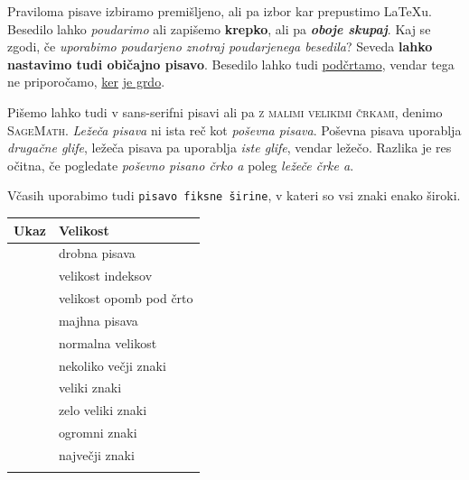\documentclass[12pt]{article}
\begin{document}
\vspace{2cm}

Praviloma pisave izbiramo premišljeno, ali pa izbor kar prepustimo LaTeXu.
Besedilo lahko \emph{poudarimo} ali zapišemo \textbf{krepko}, ali pa \emph{\textbf{oboje skupaj}}.
Kaj se zgodi, če \emph{uporabimo poudarjeno \emph{znotraj} poudarjenega besedila}?
Seveda \textbf{lahko nastavimo tudi \textnormal{običajno} pisavo}.
Besedilo lahko tudi \underline{podčrtamo}, vendar tega ne priporočamo, \underline{ker} \underline{je grdo}.

Pišemo lahko tudi v \textsf{sans-serifni pisavi} ali pa \textsc{z malimi velikimi črkami},
denimo \textsc{SageMath}. 
\textsl{Ležeča pisava} {ni ista reč kot} \textit{poševna pisava}.
Poševna pisava uporablja \textit{drugačne glife}, ležeča pisava pa uporablja \textsl{iste glife}, vendar ležečo. 
Razlika je res očitna, če pogledate \textit{poševno pisano črko a} poleg \textsl{ležeče črke a}.

Včasih uporabimo tudi \texttt{pisavo fiksne širine}, v kateri so vsi znaki enako široki.


\vspace{2cm}

\begin{tabular}{p{}p{}}
        Ukaz  & Velikost                               \\
        \hline
        \texttt{{\tiny}}  & {\tiny drobna pisava} \\                      
        \texttt{{\scriptsize}} & {\scriptsize velikost indeksov}           \\
        \texttt{{\footnotesize}}           & {\footnotesize  velikost opomb pod črto}       \\
        \texttt{{\small}}    & {\small majhna pisava}                     \\
        \texttt{{\normalsize}}             & {\normalsize  normalna velikost}              \\
        \texttt{{\large}}                  & {\large nekoliko večji znaki}                     \\
        \texttt{{\Large}}  & {\Large veliki znaki}                      \\
        \texttt{{\LARGE}}                  &{\LARGE zelo veliki znaki}                  \\
        \multirow{2}{*}{\texttt{{\huge}} } & \multirow{2}{*}{{\huge ogromni znaki}}        \\
        & \\
        \multirow{2}{*}{\texttt{{\Huge}} } & \multirow{2.2}{*}{{\Huge največji znaki} }   \\
        & \\
      \end{tabular}
\end{document}
